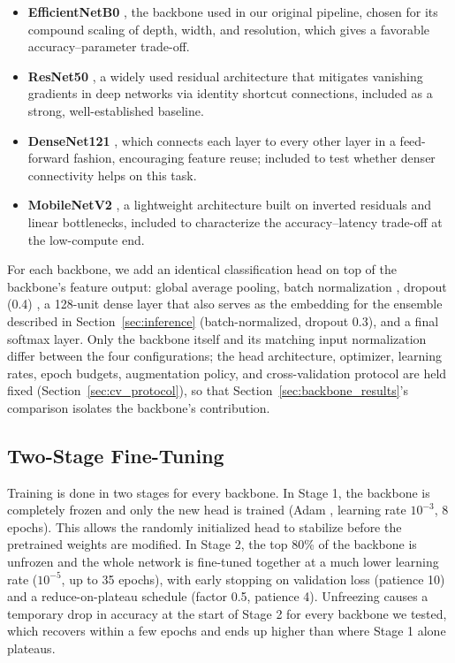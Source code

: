 \documentclass[11pt]{article}
\begin{document}
\begin{itemize}
    \item \textbf{EfficientNetB0} \cite{tan2019efficientnet}, the backbone used in our original pipeline, chosen for its compound scaling of depth, width, and resolution, which gives a favorable accuracy--parameter trade-off.
    \item \textbf{ResNet50} \cite{he2016resnet}, a widely used residual architecture that mitigates vanishing gradients in deep networks via identity shortcut connections, included as a strong, well-established baseline.
    \item \textbf{DenseNet121} \cite{huang2017densenet}, which connects each layer to every other layer in a feed-forward fashion, encouraging feature reuse; included to test whether denser connectivity helps on this task.
    \item \textbf{MobileNetV2} \cite{sandler2018mobilenetv2}, a lightweight architecture built on inverted residuals and linear bottlenecks, included to characterize the accuracy--latency trade-off at the low-compute end.
\end{itemize}

For each backbone, we add an identical classification head on top of the backbone's feature output: global average pooling, batch normalization \cite{ioffe2015batchnorm}, dropout (0.4) \cite{srivastava2014dropout}, a 128-unit dense layer that also serves as the embedding for the ensemble described in Section~\ref{sec:inference} (batch-normalized, dropout 0.3), and a final softmax layer. Only the backbone itself and its matching input normalization differ between the four configurations; the head architecture, optimizer, learning rates, epoch budgets, augmentation policy, and cross-validation protocol are held fixed (Section~\ref{sec:cv_protocol}), so that Section~\ref{sec:backbone_results}'s comparison isolates the backbone's contribution.

\subsection{Two-Stage Fine-Tuning}
\label{sec:finetuning}
Training is done in two stages for every backbone. In Stage 1, the backbone is completely frozen and only the new head is trained (Adam \cite{kingma2015adam}, learning rate $10^{-3}$, 8 epochs). This allows the randomly initialized head to stabilize before the pretrained weights are modified. In Stage 2, the top 80\% of the backbone is unfrozen and the whole network is fine-tuned together at a much lower learning rate ($10^{-5}$, up to 35 epochs), with early stopping on validation loss (patience 10) and a reduce-on-plateau schedule (factor 0.5, patience 4). Unfreezing causes a temporary drop in accuracy at the start of Stage 2 for every backbone we tested, which recovers within a few epochs and ends up higher than where Stage 1 alone plateaus.
\end{document}
